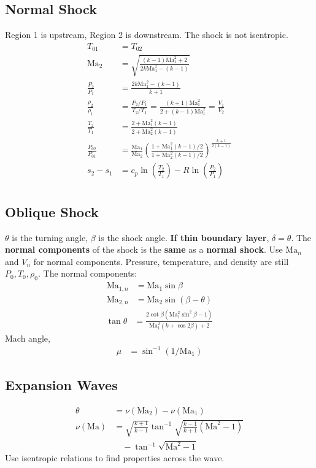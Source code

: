 \subsection{Normal Shock}
Region 1 is upstream, Region 2 is downstream. The shock is not isentropic. 
\begin{align*}
    T_{01} &= T_{02} \\
    \text{Ma}_2 &= \sqrt{\frac{(k - 1)\text{Ma}_1^2 + 2}{2k\text{Ma}_1^2 - (k-1)}} \\
    \frac{P_2}{P_1} &= \frac{2k\text{Ma}_1^2 - (k-1)}{k+1} \\
    \frac{\rho_2}{\rho_1} &= \frac{P_2/P_1}{T_2/T_1} = \frac{(k+1)\text{Ma}_1^2}{2 + (k-1)\text{Ma}_1^2} = \frac{V_1}{V_2} \\
    \frac{T_2}{T_1} &= \frac{2 + \text{Ma}_1^2(k-1)}{2 + \text{Ma}_2^2(k-1)} \\
    \frac{P_{02}}{P_{01}} &= \frac{\text{Ma}_1}{\text{Ma}_2} \left(\frac{1 + \text{Ma}_1^2(k-1)/2}{1 + \text{Ma}_2^2(k-1)/2}\right)^{\frac{k+1}{2(k-1)}} \\
    s_2 - s_1 &= c_p \ln\left(\frac{T_2}{T_1}\right) - R \ln\left(\frac{P_2}{P_1}\right) \\
\end{align*}

\subsection{Oblique Shock}
$\theta$ is the turning angle, $\beta$ is the shock angle. \textbf{If thin boundary layer}, $\delta = \theta$.
The \textbf{normal components} of the shock is the \textbf{same} as a \textbf{normal shock}. Use $\text{Ma}_{n}$ and $V_{n}$ for normal components. Pressure, temperature, and density are still $P_0, T_0, \rho_0$.
The normal components:
\begin{align*}
    \text{Ma}_{1, n} &= \text{Ma}_1 \sin\beta \\
    \text{Ma}_{2, n} &= \text{Ma}_2 \sin(\beta - \theta)
\end{align*}
\begin{align*}
    \tan\theta &= \frac{2\cot\beta (\text{Ma}_1^2 \sin^2\beta - 1)}{\text{Ma}_1^2 (k + \cos 2\beta) + 2} 
\end{align*}
Mach angle,
\begin{align*}
    \mu &= \sin^{-1}\left(1/\text{Ma}_1\right)
\end{align*}

\subsection{Expansion Waves}
\begin{align*}
    \theta &= \nu(\text{Ma}_2) - \nu(\text{Ma}_1) \\
    \nu(\text{Ma}) &= \sqrt{\frac{k + 1}{k - 1}} \tan^{-1} \sqrt{\frac{k - 1}{k + 1}(\text{Ma}^2 - 1)} \\
    & \quad - \tan^{-1}\sqrt{\text{Ma}^2 - 1}
\end{align*}
Use isentropic relations to find properties across the wave.